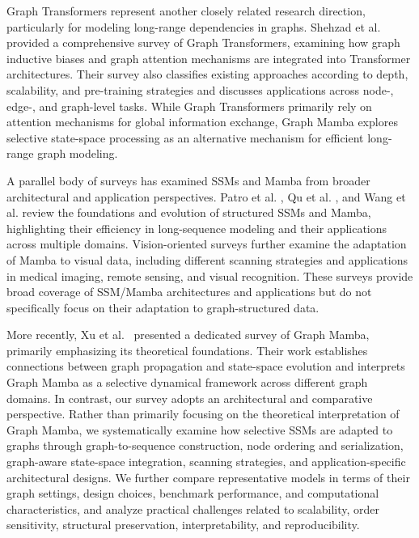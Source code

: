 \documentclass[acmsmall]{acmart}
\begin{document}
Graph Transformers represent another closely related research direction,
particularly for modeling long-range dependencies in graphs. Shehzad et
al.~\cite{shehzad2026graph} provided a comprehensive survey of Graph
Transformers, examining how graph inductive biases and graph attention
mechanisms are integrated into Transformer architectures. Their survey also
classifies existing approaches according to depth, scalability, and
pre-training strategies and discusses applications across node-, edge-, and
graph-level tasks. 
While Graph Transformers primarily rely on attention mechanisms for global
information exchange, Graph Mamba explores selective state-space processing as
an alternative mechanism for efficient long-range graph modeling.


A parallel body of surveys has examined SSMs and Mamba from broader architectural and application perspectives. Patro et al. \cite{patro2024mamba}, Qu et al. \cite{qu2024survey}, and Wang et al. \cite{wang2024state} review the foundations and evolution of structured SSMs and Mamba, highlighting their efficiency in long-sequence modeling and their applications across multiple domains. 
Vision-oriented surveys \cite{rahman2024mamba,liu2024vision} further examine the adaptation of Mamba to visual data, including different scanning strategies and applications in medical imaging, remote sensing, and visual recognition. These surveys provide broad coverage of SSM/Mamba architectures and applications but do not specifically focus on their adaptation to graph-structured data.

More recently, Xu et al.~\cite{xu2026graph} presented a dedicated survey of
Graph Mamba, primarily emphasizing its theoretical foundations. Their work
establishes connections between graph propagation and state-space evolution
and interprets Graph Mamba as a selective dynamical framework across different
graph domains. In contrast, our survey adopts an architectural and comparative
perspective. Rather than primarily focusing on the theoretical interpretation
of Graph Mamba, we systematically examine how selective SSMs are adapted to
graphs through graph-to-sequence construction, node ordering and serialization,
graph-aware state-space integration, scanning strategies, and application-specific
architectural designs. We further compare representative models in terms of
their graph settings, design choices, benchmark performance, and computational
characteristics, and analyze practical challenges related to scalability,
order sensitivity, structural preservation, interpretability, and
reproducibility.
\end{document}

